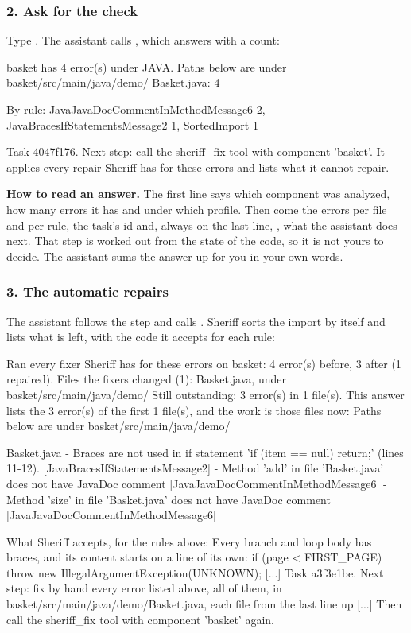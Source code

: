 \documentclass[11pt,a4paper]{article}
\begin{document}
\subsubsection{2. Ask for the check}
Type . The assistant calls
, which answers with a count:

\begin{answer}
basket has 4 error(s) under JAVA.
Paths below are under basket/src/main/java/demo/
  Basket.java: 4

By rule: JavaJavaDocCommentInMethodMessage6 2, JavaBracesIfStatementsMessage2 1, SortedImport 1

Task 4047f176.
Next step: call the sheriff_fix tool with component 'basket'. It applies every repair Sheriff has for these errors and lists what it cannot repair.
\end{answer}

\begin{note}
\textbf{How to read an answer.} The first line says which component was
analyzed, how many errors it has and under which profile. Then come the errors
per file and per rule, the task's id and, always on the last line,
\textbf{}, what the assistant does next. That step is worked
out from the state of the code, so it is not yours to decide. The assistant
sums the answer up for you in your own words.
\end{note}

\subsubsection{3. The automatic repairs}
The assistant follows the step and calls . Sheriff sorts the
import by itself and lists what is left, with the code it accepts for each
rule:

\begin{answer}
Ran every fixer Sheriff has for these errors on basket: 4 error(s) before, 3 after (1 repaired).
Files the fixers changed (1): Basket.java, under basket/src/main/java/demo/
Still outstanding: 3 error(s) in 1 file(s). This answer lists the 3 error(s) of the first 1 file(s), and the work is those files now:
Paths below are under basket/src/main/java/demo/

Basket.java
  - Braces are not used in if statement 'if (item == null) return;' (lines 11-12).  [JavaBracesIfStatementsMessage2]
  - Method 'add' in file 'Basket.java' does not have JavaDoc comment  [JavaJavaDocCommentInMethodMessage6]
  - Method 'size' in file 'Basket.java' does not have JavaDoc comment  [JavaJavaDocCommentInMethodMessage6]

What Sheriff accepts, for the rules above:
Every branch and loop body has braces, and its content starts on a line of its own:
    if (page < FIRST_PAGE) {
        throw new IllegalArgumentException(UNKNOWN);
    }
[...]
Task a3f3e1be.
Next step: fix by hand every error listed above, all of them, in basket/src/main/java/demo/Basket.java, each file from the last line up [...] Then call the sheriff_fix tool with component 'basket' again.
\end{answer}
\end{document}
